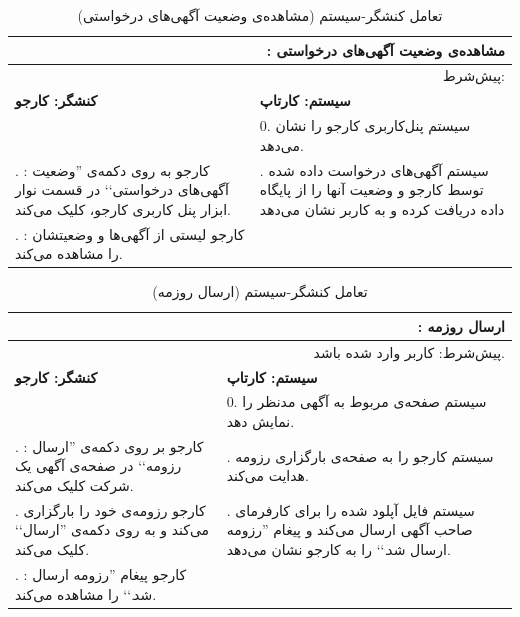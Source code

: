 \documentclass[12pt,svgnames,oneside]{book}
\newcommand{\say}[1]{‍''{#1}`‍`}
\newcommand{\uc}[1]{\lr{UC{#1}}}
\newcommand{\tucbw}{\lr{TUCBW}}
\newcommand{\tucew}{\lr{TUCEW}}
\newcommand{\actorsystem}[1]{
\textbf{کنشگر: {#1}} &
\textbf{سیستم: کارتاپ} \\
}
\newcommand{\zerostep}[1]{
& 0. {#1} \\
}
\newcounter{UseCaseCounter}
\newcommand{\step}[1]{
\stepcounter{UseCaseCounter}\arabic{UseCaseCounter}. {#1}
}
\newcommand{\ucname}[2]{
\multicolumn{2}{|r|}{\uc{{#1}}: {#2}} \\
}
\newcommand{\preif}[1]{
\multicolumn{2}{|r|}{پیش‌شرط:‌ {#1}} \\
}
\begin{document}
\setcounter{UseCaseCounter}{0}
\begin{table}[H]
\caption{تعامل کنشگر-سیستم  (مشاهده‌ی وضعیت آگهی‌های درخواستی)}
\label{table:uc:see-reqs}
\begin{center}
\begin{tabular}{|p{}|p{}|}
\hline

\ucname{18}{مشاهده‌ی وضعیت آگهی‌های درخواستی}
\hline

\preif{}
\hline

\actorsystem{کارجو}
\hline

\zerostep{{\small سیستم پنل‌کاربری کارجو را نشان‌ می‌دهد.}}
\hline

\step{{\small\textbf{\tucbw}: کارجو به روی دکمه‌ی \say{وضعیت‌ آگهی‌های درخواستی} در قسمت نوار ابزار پنل کاربری کارجو، کلیک می‌کند.}} & 

\step{{\small سیستم آگهی‌های درخواست داده شده توسط کارجو و وضعیت‌ آنها را از پایگاه داده دریافت کرده و به کاربر نشان می‌دهد}} \\
\hline

\step{{\small\textbf{\tucew}: کارجو لیستی از آگهی‌ها و وضعیتشان را مشاهده می‌کند.}} & 
\\
\hline

\end{tabular}
\end{center}
\end{table}

\setcounter{UseCaseCounter}{0}
\begin{table}[H]
\caption{تعامل کنشگر-سیستم  (ارسال روزمه)}
\label{table:uc:send-resume}
\begin{center}
\begin{tabular}{|p{}|p{}|}
\hline

\ucname{12}{ارسال روزمه}
\hline

\preif{کاربر وارد شده باشد.}
\hline

\actorsystem{کارجو}
\hline

\zerostep{{\small سیستم صفحه‌ی مربوط به آگهی مدنظر را نمایش دهد.}}
\hline

\step{{\small \textbf{\tucbw}: کارجو بر روی دکمه‌ی \say{ارسال رزومه} در صفحه‌ی آگهی یک شرکت کلیک می‌کند.}} & 
\step{{\small سیستم کارجو را به صفحه‌ی بارگزاری رزومه هدایت می‌کند.}} \\
\hline

\step{{\small کارجو رزومه‌ی خود را بارگزاری می‌کند و به روی دکمه‌ی \say{ارسال} کلیک می‌کند.}} & \step{{\small سیستم فایل آپلود شده را برای کارفرمای صاحب آگهی ارسال می‌کند و پیغام \say{رزومه ارسال شد.} را به کارجو نشان می‌دهد.}} \\ \hline

\step{{\small \textbf{\tucew}: کارجو پیغام \say{رزومه‌ ارسال شد.} را مشاهده می‌کند.}} & 
\\
\hline

\end{tabular}
\end{center}
\end{table}
\end{document}
